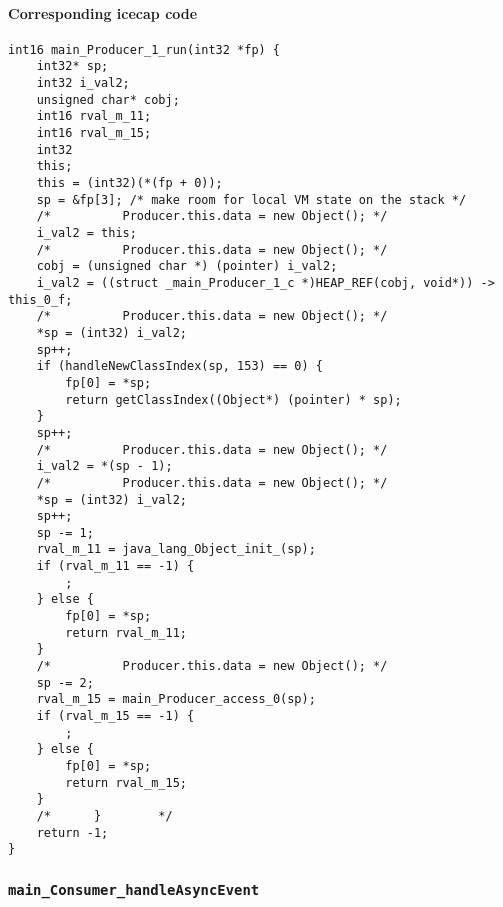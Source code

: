\paragraph{Corresponding icecap code}\hfill
\begin{lstlisting}[firstnumber=56400]
int16 main_Producer_1_run(int32 *fp) {
	int32* sp;
	int32 i_val2;
	unsigned char* cobj;
	int16 rval_m_11;
	int16 rval_m_15;
	int32
	this;
	this = (int32)(*(fp + 0));
	sp = &fp[3]; /* make room for local VM state on the stack */
	/*			Producer.this.data = new Object(); */
	i_val2 = this;
	/*			Producer.this.data = new Object(); */
	cobj = (unsigned char *) (pointer) i_val2;
	i_val2 = ((struct _main_Producer_1_c *)HEAP_REF(cobj, void*)) -> this_0_f;
	/*			Producer.this.data = new Object(); */
	*sp = (int32) i_val2;
	sp++;
	if (handleNewClassIndex(sp, 153) == 0) {
		fp[0] = *sp;
		return getClassIndex((Object*) (pointer) * sp);
	}
	sp++;
	/*			Producer.this.data = new Object(); */
	i_val2 = *(sp - 1);
	/*			Producer.this.data = new Object(); */
	*sp = (int32) i_val2;
	sp++;
	sp -= 1;
	rval_m_11 = java_lang_Object_init_(sp);
	if (rval_m_11 == -1) {
		;
	} else {
		fp[0] = *sp;
		return rval_m_11;
	}
	/*			Producer.this.data = new Object(); */
	sp -= 2;
	rval_m_15 = main_Producer_access_0(sp);
	if (rval_m_15 == -1) {
		;
	} else {
		fp[0] = *sp;
		return rval_m_15;
	}
	/*		}		 */
	return -1;
}
\end{lstlisting}

\subsubsection{\texttt{main\_Consumer\_handleAsyncEvent}}

